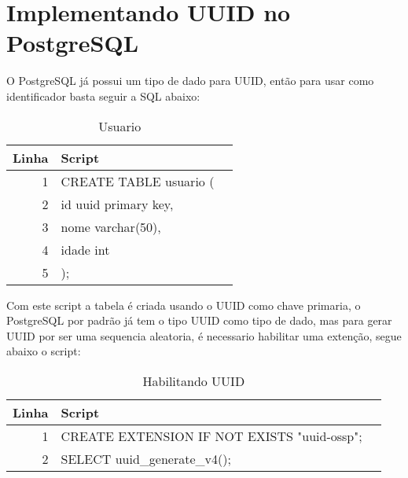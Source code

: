 \section{Implementando UUID no PostgreSQL}
O PostgreSQL já possui um tipo de dado para UUID, então para usar como identificador basta seguir a SQL abaixo:

\begin{table}[h]
\centering
\caption{Usuario}
\vspace{0.5cm}
\begin{tabular}{r|lr}
 
Linha & Script \\ %
\hline                               %
1 & CREATE TABLE usuario (\\
2 & \hspace{1cm} id uuid primary key,\\
3 & \hspace{1cm} nome varchar(50), \\
4 & \hspace{1cm} idade int \\
5 & );           %
 
\end{tabular}
\end{table}

Com este script a tabela é criada usando o UUID como chave primaria,
o PostgreSQL por padrão já tem o tipo UUID como tipo de dado, mas 
para gerar UUID por ser uma sequencia aleatoria, é necessario habilitar uma extenção,
segue abaixo o script:

\begin{table}[h]
\centering
\caption{Habilitando UUID}
\vspace{0.5cm}
\begin{tabular}{r|lr}
 
Linha & Script \\ %
\hline                               %
1 & CREATE EXTENSION IF NOT EXISTS "uuid-ossp";\\
2 & SELECT uuid\_generate\_v4();
 
\end{tabular}
\end{table}


 
 